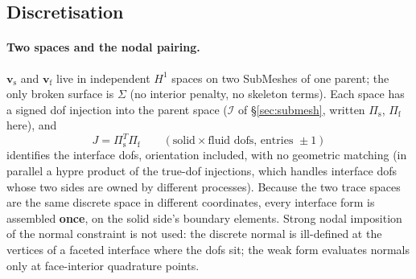 \documentclass[11pt]{article}
\numberwithin{equation}{section}
\theoremstyle{remark}
\newcommand{\vv}{\mathbf{v}}
\begin{document}
\subsection{Discretisation}
\label{sec:slip-disc}

\paragraph{Two spaces and the nodal pairing.} $\vv_{\mathrm{s}}$ and
$\vv_{\mathrm{f}}$ live in independent $H^1$ spaces on two SubMeshes of one
parent; the only broken surface is $\Sigma$ (no interior penalty, no
skeleton terms). Each space has a signed dof injection into the parent
space ($\mathcal{I}$ of \S\ref{sec:submesh}, written $\Pi_{\mathrm{s}}$,
$\Pi_{\mathrm{f}}$ here), and
\begin{equation}
  J = \Pi_{\mathrm{s}}^T\Pi_{\mathrm{f}}
  \qquad(\text{solid}\times\text{fluid dofs, entries }\pm1)
\end{equation}
identifies the interface dofs, orientation included, with no geometric
matching (in parallel a hypre product of the true-dof injections, which
handles interface dofs whose two sides are owned by different processes).
Because the two trace spaces are the same discrete space in different
coordinates, every interface form is assembled \textbf{once}, on the solid
side's boundary elements. Strong nodal imposition of the normal constraint
is not used: the discrete normal is ill-defined at the vertices of a
faceted interface where the dofs sit; the weak form evaluates normals only
at face-interior quadrature points.
\end{document}
